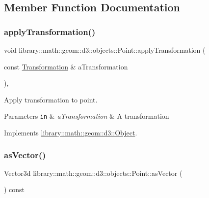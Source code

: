\subsection{Member Function Documentation}
\mbox{\label{classlibrary_1_1math_1_1geom_1_1d3_1_1objects_1_1_point_ad2052f6ef5df88b75cae09c58a678f95}} 
\subsubsection{\texorpdfstring{apply\+Transformation()}{applyTransformation()}}
{\footnotesize\ttfamily void library\+::math\+::geom\+::d3\+::objects\+::\+Point\+::apply\+Transformation (\begin{DoxyParamCaption}\item[{const \hyperlink{classlibrary_1_1math_1_1geom_1_1d3_1_1_transformation}{Transformation} \&}]{a\+Transformation }\end{DoxyParamCaption})\hspace{0.3cm}{\ttfamily [override]}, {\ttfamily [virtual]}}



Apply transformation to point. 


\begin{DoxyParams}[1]{Parameters}
\mbox{\tt in}  & {\em a\+Transformation} & A transformation \\
\hline
\end{DoxyParams}


Implements \hyperlink{classlibrary_1_1math_1_1geom_1_1d3_1_1_object_a5fc47b1ee5d9a28efc6010d3d1512470}{library\+::math\+::geom\+::d3\+::\+Object}.

\mbox{\label{classlibrary_1_1math_1_1geom_1_1d3_1_1objects_1_1_point_ac0fada0a034f3104675c713b329a97eb}} 
\subsubsection{\texorpdfstring{as\+Vector()}{asVector()}}
{\footnotesize\ttfamily Vector3d library\+::math\+::geom\+::d3\+::objects\+::\+Point\+::as\+Vector (\begin{DoxyParamCaption}{ }\end{DoxyParamCaption}) const}



